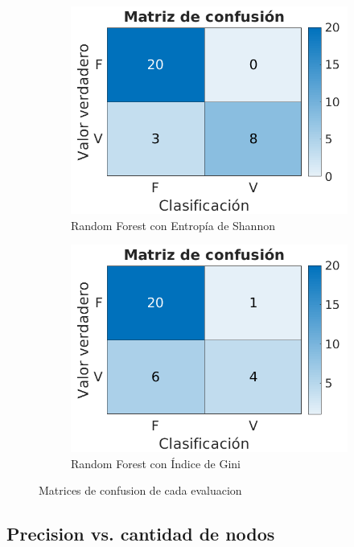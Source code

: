 \documentclass[a4paper]{article}
\begin{document}
\begin{figure}[h]
\begin{subfigure}{.4\textwidth}
      \includegraphics[width=\linewidth]{img/cm-rf-shannon.png}
      \caption{Random Forest con Entropía de Shannon}
      \label{titanic-cm:sfig3}
    \end{subfigure}
    \begin{subfigure}{.4\textwidth}
      \centering
      \includegraphics[width=\linewidth]{img/cm-rf-gini.png}
      \caption{Random Forest con Índice de Gini}
      \label{titanic-cm:sfig4}
    \end{subfigure}
    \caption{Matrices de confusion de cada evaluacion}
    \label{titanic-cm:fig}
  \end{figure}

\subsection{Precision vs. cantidad de nodos}
\end{document}
